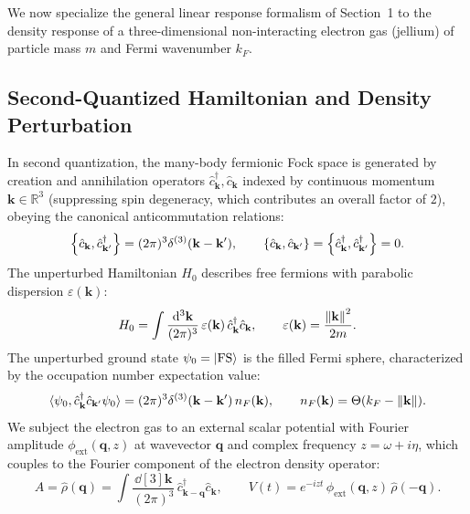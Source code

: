 \documentclass[11pt, a4paper]{article}
\numberwithin{equation}{section}
\begin{document}
We now specialize the general linear response formalism of Section~1 to the density response of a three-dimensional non-interacting electron gas (jellium) of particle mass $m$ and Fermi wavenumber $k_F$.

\subsection{Second-Quantized Hamiltonian and Density Perturbation}

In second quantization, the many-body fermionic Fock space is generated by creation and annihilation operators $\hat{c}^\dagger_{\mathbf{k}}, \hat{c}_{\mathbf{k}}$ indexed by continuous momentum $\mathbf{k} \in \mathbb{R}^3$ (suppressing spin degeneracy, which contributes an overall factor of $2$), obeying the canonical anticommutation relations:
\begin{equation}
  \acomm{\hat{c}_{\mathbf{k}}}{\hat{c}^\dagger_{\mathbf{k}'}} = (2\pi)^3 \delta^{(3)}(\mathbf{k} - \mathbf{k}'), \qquad
  \acomm{\hat{c}_{\mathbf{k}}}{\hat{c}_{\mathbf{k}'}} = \acomm{\hat{c}^\dagger_{\mathbf{k}}}{\hat{c}^\dagger_{\mathbf{k}'}} = 0.
\end{equation}
The unperturbed Hamiltonian $H_0$ describes free fermions with parabolic dispersion $\varepsilon(\mathbf{k})$:
\begin{equation}
  H_0 = \int \frac{\dd[3]{\mathbf{k}}}{(2\pi)^3} \, \varepsilon(\mathbf{k}) \, \hat{c}^\dagger_{\mathbf{k}} \hat{c}_{\mathbf{k}}, \qquad
  \varepsilon(\mathbf{k}) = \frac{\norm{\mathbf{k}}^2}{2m}.
\end{equation}
The unperturbed ground state $\psi_0 = \ket{\mathrm{FS}}$ is the filled Fermi sphere, characterized by the occupation number expectation value:
\begin{equation}\label{eq:fermi_occupation}
  \langle \psi_0, \hat{c}^\dagger_{\mathbf{k}} \hat{c}_{\mathbf{k}'} \psi_0 \rangle
  = (2\pi)^3 \delta^{(3)}(\mathbf{k} - \mathbf{k}') \, n_F(\mathbf{k}), \qquad
  n_F(\mathbf{k}) = \Theta(k_F - \norm{\mathbf{k}}).
\end{equation}
We subject the electron gas to an external scalar potential with Fourier amplitude $\phi_{\mathrm{ext}}(\mathbf{q}, z)$ at wavevector $\mathbf{q}$ and complex frequency $z = \omega + i\eta$, which couples to the Fourier component of the electron density operator:
\begin{equation}
  A = \hat{\rho}(\mathbf{q}) = \int \frac{\dd[3]{\mathbf{k}}}{(2\pi)^3} \, \hat{c}^\dagger_{\mathbf{k}-\mathbf{q}} \hat{c}_{\mathbf{k}}, \qquad
  V(t) = e^{-i z t} \, \phi_{\mathrm{ext}}(\mathbf{q}, z) \, \hat{\rho}(-\mathbf{q}).
\end{equation}
\end{document}
